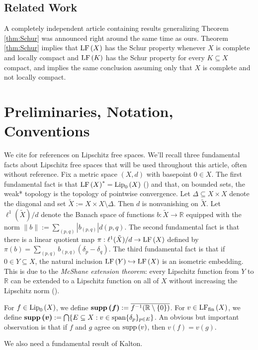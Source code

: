 \documentclass[12pt]{amsart}
\theoremstyle{definition}
\numberwithin{equation}{section}
\def \R {\mathbb{R}}
\def \sbs {\subseteq}
\def \cross {\times}
\def \closure {\overline}
\begin{document}
\subsection{Related Work}
A completely independent article containing results generalizing Theorem \ref{thm:Schur} was announced right around the same time as ours. Theorem \ref{thm:Schur} implies that $\LF{X}$ has the Schur property whenever $X$ is complete and locally compact and $\LF{K}$ has the Schur property for every $K \sbs X$ compact, and \cite[Corollary 2.6]{APP2} implies the same conclusion assuming only that $X$ is complete and not locally compact.

\section{Preliminaries, Notation, Conventions} \label{sec:prelims}
We cite \cite{W} for references on Lipschitz free spaces. We'll recall three fundamental facts about Lipschitz free spaces that will be used throughout this article, often without reference. Fix a metric space $(X,d)$ with basepoint $0 \in X$. The first fundamental fact is that $\LF{X}^* = \Lip{X}$ (\cite[Theorem 2.2.2]{W}) and that, on bounded sets, the weak* topology is the topology of pointwise convergence. Let $\Delta \sbs X \cross X$ denote the diagonal and set $\tilde{X} := X \cross X \setminus \Delta$. Then $d$ is nonvanishing on $\tilde{X}$. Let $\ell^1(\tilde{X})/d$ denote the Banach space of functions $b: \tilde{X} \to \R$ equipped with the norm $\|b\| := \sum_{(p,q)}|b_{(p,q)}|d(p,q)$. The second fundamental fact is that there is a linear quotient map $\pi: \ell^1(\tilde{X})/d \to \LF{X}$ defined by $\pi(b) = \sum_{(p,q)}b_{(p,q)}(\delta_p-\delta_q)$. The third fundamental fact is that if $0 \in Y \sbs X$, the natural inclusion $\LF{Y} \hookrightarrow \LF{X}$ is an isometric embedding. This is due to the \emph{McShane extension theorem}: every Lipschitz function from $Y$ to $\R$ can be extended to a Lipschitz function on all of $X$ without increasing the Lipschitz norm (\cite[Theorem 1.5.6(a)]{W}).

For $f \in \Lip{X}$, we define $\boldsymbol{\supp{f}} := \closure{f^{-1}(\R \setminus \{0\})}$. For $v \in \LFf{X}$, we define $\boldsymbol{\supp{v}} := \bigcap \{E \sbs X: v \in \text{span}\{\delta_p\}_{p \in E}\}$. An obvious but important observation is that if $f$ and $g$ agree on $\supp{v}$, then $v(f) = v(g)$.

We also need a fundamental result of Kalton.
\end{document}
